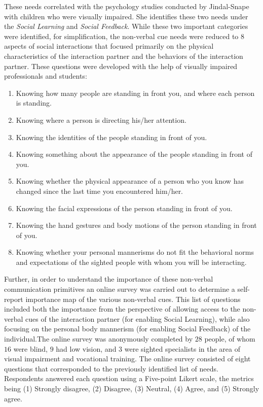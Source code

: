 \documentclass[oneside,11pt]{memoir}
\begin{document}
These needs correlated with the psychology studies conducted by Jindal-Snape with children who were visually impaired. She identifies these two needs under the \emph{Social Learning} and \emph{Social Feedback}. While these two important categories were identified, for simplification, the non-verbal cue needs were reduced to $8$ aspects of social interactions that focused primarily on the physical characteristics of the interaction partner and the behaviors of the
interaction partner. These questions were developed with the help of visually impaired professionals and students:

\begin{enumerate}[1.]
\item Knowing how many people are standing in front you, and where each person is standing.
\item Knowing where a person is directing his/her attention.
\item Knowing the identities of the people standing in front of you.
\item Knowing something about the appearance of the people standing in front of you.
\item Knowing whether the physical appearance of a person who you know has changed since the last time you encountered him/her.
\item Knowing the facial expressions of the person standing in front of you.
\item Knowing the hand gestures and body motions of the person standing in front of you.
\item Knowing whether your personal mannerisms do not fit the behavioral norms and expectations of the sighted people with whom you will be interacting.
\end{enumerate}

Further, in order to understand the importance of these non-verbal communication primitives an online survey was carried out to determine a self-report importance map of the various non-verbal cues. This list of questions included both the importance from the perspective of allowing access to the non-verbal cues of the interaction partner (for enabling Social Learning), while also focusing on the personal body mannerism (for enabling Social Feedback) of the individual.The online survey was anonymously completed by $28$ people, of whom $16$ were blind, $9$ had low vision, and $3$ were sighted specialists in the area of visual impairment and vocational training. The online survey consisted of eight questions that corresponded to the previously identified list of needs. Respondents answered each question using a Five-point Likert scale, the metrics being (1) Strongly disagree, (2) Disagree, (3) Neutral, (4) Agree, and (5) Strongly agree.
\end{document}
